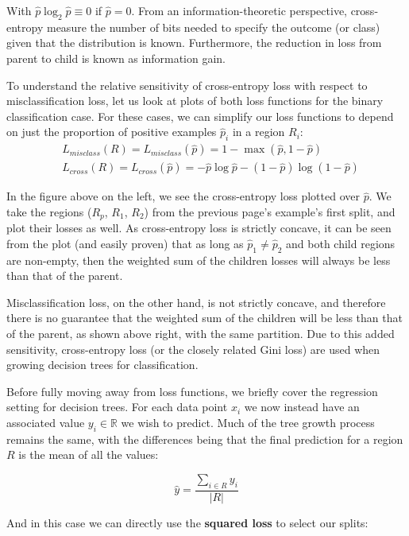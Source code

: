 \documentclass{article}
\begin{document}
 With $\hat{p} \log_2 \hat{p} \equiv 0$ if $\hat{p} = 0$.  From an information-theoretic perspective, cross-entropy measure the number of bits needed to specify the outcome (or class) given that the distribution is known.  Furthermore, the reduction in loss from parent to child is known as information gain.
 
 To understand the relative sensitivity of cross-entropy loss with respect to misclassification loss, let us look at plots of both loss functions for the binary classification case.  For these cases, we can simplify our loss functions to depend on just the proportion of positive examples $\hat{p}_i$ in a region $R_i$: 
 \begin{align*}
&L_{misclass}(R) = L_{misclass}(\hat{p}) = 1 - \max(\hat{p}, 1 - \hat{p})\\
&L_{cross}(R) = L_{cross}(\hat{p}) = - \hat{p} \log{\hat{p}} - (1 - \hat{p}) \log{(1 - \hat{p})}
 \end{align*}
 
 
 In the figure above on the left, we see the cross-entropy loss plotted over $\hat{p}$.  We take the regions ($R_p$, $R_1$, $R_2$) from the previous page's example's first split, and plot their losses as well.  As cross-entropy loss is strictly concave, it can be seen from the plot (and easily proven) that as long as $\hat{p}_1 \neq \hat{p}_2$ and both child regions are non-empty, then the weighted sum of the children losses will always be less than that of the parent.
 
 Misclassification loss, on the other hand, is not strictly concave, and therefore there is no guarantee that the weighted sum of the children will be less than that of the parent, as shown above right, with the same partition.  Due to this added sensitivity, cross-entropy loss (or the closely related Gini loss) are used when growing decision trees for classification.
 
Before fully moving away from loss functions, we briefly cover the regression setting for decision trees.  For each data point $x_i$ we now instead have an associated value $y_i \in \mathbb{R}$ we wish to predict.  Much of the tree growth process remains the same, with the differences being that the final prediction for a region $R$ is the mean of all the values:

$$\hat{y} = \frac{\sum_{i \in R} y_i}{|R|}$$

And in this case we can directly use the {\bf squared loss} to select our splits:
\end{document}
